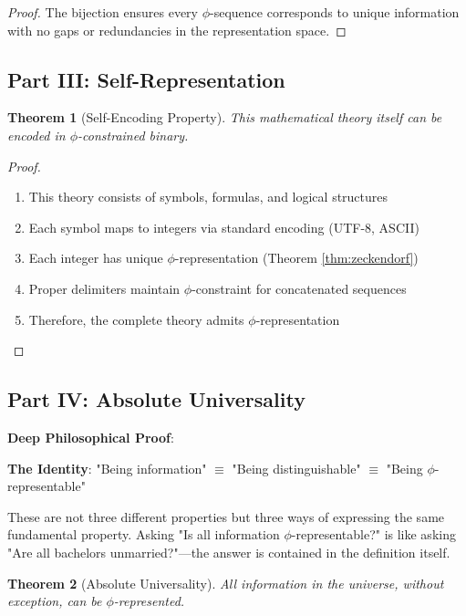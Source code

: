 \documentclass[12pt,letterpaper]{article}
\newtheorem{theorem}{Theorem}[section]
\begin{document}
\begin{proof}
The bijection ensures every $\phi$-sequence corresponds to unique information with no gaps or redundancies in the representation space.
\end{proof}

\subsection{Part III: Self-Representation}

\begin{theorem}[Self-Encoding Property]
This mathematical theory itself can be encoded in $\phi$-constrained binary.
\end{theorem}

\begin{proof}
\begin{enumerate}
\item This theory consists of symbols, formulas, and logical structures
\item Each symbol maps to integers via standard encoding (UTF-8, ASCII)
\item Each integer has unique $\phi$-representation (Theorem \ref{thm:zeckendorf})
\item Proper delimiters maintain $\phi$-constraint for concatenated sequences
\item Therefore, the complete theory admits $\phi$-representation
\end{enumerate}
\end{proof}

\subsection{Part IV: Absolute Universality}

\textbf{Deep Philosophical Proof}:

\textbf{The Identity}: "Being information" $\equiv$ "Being distinguishable" $\equiv$ "Being $\phi$-representable"

These are not three different properties but three ways of expressing the same fundamental property. Asking "Is all information $\phi$-representable?" is like asking "Are all bachelors unmarried?"—the answer is contained in the definition itself.

\begin{theorem}[Absolute Universality]
\label{thm:absolute_universality}
All information in the universe, without exception, can be $\phi$-represented.
\end{theorem}
\end{document}
